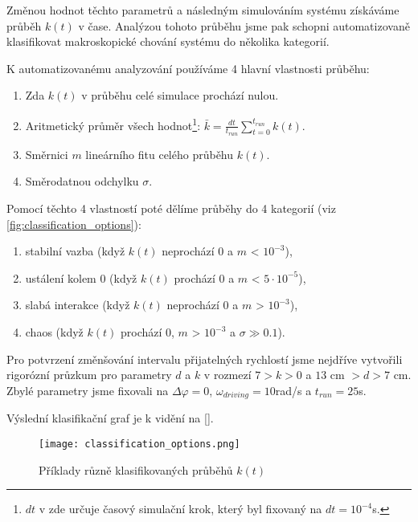Změnou hodnot těchto parametrů a následným simulováním systému získáváme průběh $k(t)$ v čase. Analýzou tohoto průběhu jsme pak schopni automatizovaně klasifikovat makroskopické chování systému do několika kategorií.

K automatizovanému analyzování používáme 4 hlavní vlastnosti průběhu:
\begin{enumerate}[topsep=0pt, partopsep=0pt]
    \setlength{\itemsep}{0pt}%
    \setlength{\parskip}{0pt}%
    \item Zda $k(t)$ v průběhu celé simulace prochází nulou.
    \item Aritmetický průměr všech hodnot\footnote{$dt$ v zde určuje časový simulační krok, který byl fixovaný na $dt = 10^{-4}$s.}: $\bar{k} = \frac{dt}{t_{run}}\sum_{t=0}^{t_{run}} k(t)$.
    \item Směrnici $m$ lineárního fitu celého průběhu $k(t)$.
    \item Směrodatnou odchylku $\sigma$.
\end{enumerate}

Pomocí těchto 4 vlastností poté dělíme průběhy do 4 kategorií (viz \autoref{fig:classification_options}):

\begin{enumerate}[topsep=0pt, partopsep=0pt]
    \setlength{\itemsep}{0pt}%
    \setlength{\parskip}{0pt}%
    \item stabilní vazba (když $k(t)$ neprochází 0 a $m$ < $10^{-3}$),
    \item ustálení kolem 0 (když $k(t)$ prochází 0 a $m$ < $5\cdot10^{-5}$),
    \item slabá interakce (když $k(t)$ neprochází 0 a $m$ > $10^{-3}$),
    \item chaos (když $k(t)$ prochází 0, $m$ > $10^{-3}$ a $\sigma \gg 0.1$).
\end{enumerate}

Pro potvrzení změnšování intervalu přijatelných rychlostí jsme nejdříve vytvořili rigorózní průzkum pro parametry $d$ a $k$ v rozmezí $7 > k > 0$ a $13$ cm $> d > 7$ cm. Zbylé parametry jsme fixovali na $\Delta \varphi = 0$, $\omega_{driving} = 10$rad/s a $t_{run} = 25$s.

Výslední klasifikační graf je k vidění na \autoref{}.

\begin{figure}[H]
    \texttt{[image: classification\_options.png]}
    \centering
    \caption{Příklady různě klasifikovaných průběhů $k(t)$}
    \label{fig:classification_options}
\end{figure}